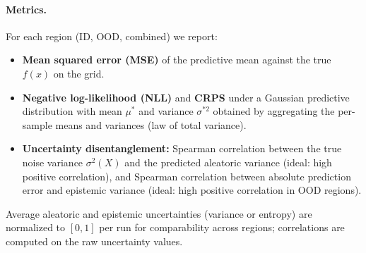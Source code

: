 \paragraph{Metrics.}
For each region (ID, OOD, combined) we report:
\begin{itemize}
  \item \textbf{Mean squared error (MSE)} of the predictive mean against the true $f(x)$ on the grid.
  \item \textbf{Negative log-likelihood (NLL)} and \textbf{CRPS} under a Gaussian predictive distribution with mean $\mu^*$ and variance $\sigma^{*2}$ obtained by aggregating the per-sample means and variances (law of total variance).
  \item \textbf{Uncertainty disentanglement:} Spearman correlation between the true noise variance $\sigma^2(X)$ and the predicted aleatoric variance (ideal: high positive correlation), and Spearman correlation between absolute prediction error and epistemic variance (ideal: high positive correlation in OOD regions).
\end{itemize}
Average aleatoric and epistemic uncertainties (variance or entropy) are normalized to $[0,1]$ per run for comparability across regions; correlations are computed on the raw uncertainty values.
